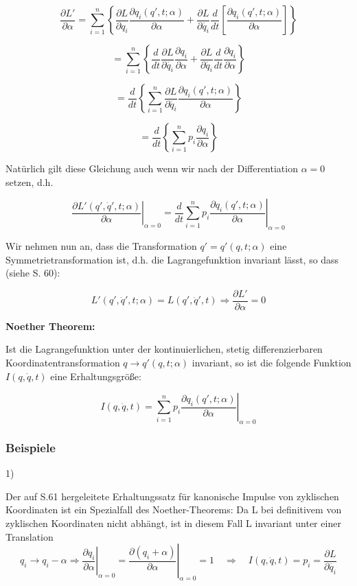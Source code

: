 \documentclass[10pt, letterpaper]{article}
\begin{document}
\[\frac{\partial L'}{\partial \alpha} = \sum_{i=1}^n \left\{\frac{\partial L}{\partial q_i}\frac{\partial q_i(q',t;\alpha)}{\partial \alpha} + \frac{\partial L}{\partial \dot{q_i}}\frac{d}{dt}\left[\frac{\partial q_i(q',t;\alpha)}{\partial \alpha}\right]\right\}\]

\[= \sum_{i=1}^n \left\{\frac{d}{dt}\frac{\partial L}{\partial \dot{q_i}}\frac{\partial q_i}{\partial \alpha} + \frac{\partial L}{\partial \dot{q_i}}\frac{d}{dt}\frac{\partial q_i}{\partial \alpha}\right\}\]

\[= \frac{d}{dt}\left\{\sum_{i=1}^n \frac{\partial L}{\partial \dot{q_i}}\frac{\partial q_i(q',t;\alpha)}{\partial \alpha}\right\}\]

\[= \frac{d}{dt}\left\{\sum_{i=1}^n p_i\frac{\partial q_i}{\partial \alpha}\right\}\]

Natürlich gilt diese Gleichung auch wenn wir nach der Differentiation $\alpha=0$ setzen, d.h.

\[\left.\frac{\partial L'(q',\dot{q}',t;\alpha)}{\partial \alpha}\right|_{\alpha=0} = \frac{d}{dt}\sum_{i=1}^n p_i\left.\frac{\partial q_i(q',t;\alpha)}{\partial \alpha}\right|_{\alpha=0}\]

Wir nehmen nun an, dass die Transformation $q'=q'(q,t;\alpha)$ eine Symmetrietransformation ist, d.h. die Lagrangefunktion invariant lässt, so dass (siehe S. 60):

\[L'(q',\dot{q}',t;\alpha) = L(q',\dot{q}',t) \Rightarrow \frac{\partial L'}{\partial \alpha} = 0\]



\textbf{Noether Theorem:}

Ist die Lagrangefunktion unter der kontinuierlichen, stetig differenzierbaren Koordinatentransformation $q\to q'(q,t;\alpha)$ invariant, so ist die folgende Funktion $I(q,\dot{q},t)$ eine Erhaltungsgröße:

\[I(q,\dot{q},t) = \sum_{i=1}^n p_i\left.\frac{\partial q_i(q',t;\alpha)}{\partial \alpha}\right|_{\alpha=0}\]




\subsubsection{Beispiele}

1) 

Der auf S.61 hergeleitete Erhaltungssatz für kanonische Impulse von zyklischen Koordinaten ist ein Spezialfall des Noether-Theorems: Da L bei definitivem von zyklischen Koordinaten nicht abhängt, ist in diesem Fall L invariant unter einer Translation 
$$q_i \rightarrow q_i - \alpha \Rightarrow \left.\frac{\partial q_i}{\partial \alpha}\right|_{\alpha=0} = \left.\frac{\partial (q_i+\alpha)}{\partial \alpha}\right|_{\alpha=0} = 1 \quad \Rightarrow\quad I(q,\dot{q},t) = p_i = \frac{\partial L}{\partial \dot{q_i}}$$
\end{document}
